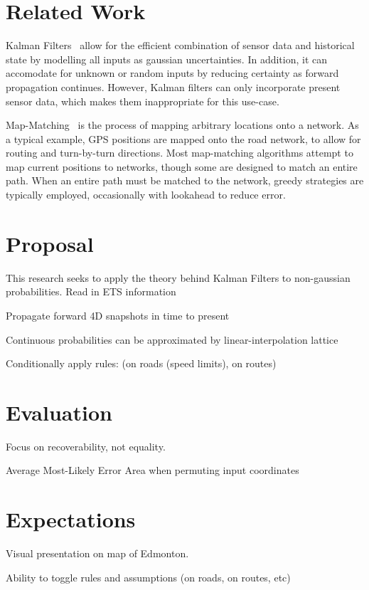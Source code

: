 \documentclass{article}
\begin{document}
\section{Related Work}

  Kalman Filters~\cite{kalmanJBE60} allow for the efficient combination of sensor data and historical state by modelling all inputs as gaussian uncertainties. In addition, it can accomodate for unknown or random inputs by reducing certainty as forward propagation continues. However, Kalman filters can only incorporate present sensor data, which makes them inappropriate for this use-case.

  Map-Matching~\cite{brakatsoulasVLDB05} is the process of mapping arbitrary locations onto a network. As a typical example, GPS positions are mapped onto the road network, to allow for routing and turn-by-turn directions.
Most map-matching algorithms attempt to map current positions to networks, though some are designed to match an entire path. When an entire path must be matched to the network, greedy strategies are typically employed, occasionally with lookahead to reduce error.

\section{Proposal}

This research seeks to apply the theory behind Kalman Filters to non-gaussian probabilities.
Read in ETS information

Propagate forward 4D snapshots in time to present

Continuous probabilities can be approximated by linear-interpolation lattice

Conditionally apply rules: (on roads (speed limits), on routes)

\section{Evaluation}

Focus on recoverability, not equality.

Average Most-Likely Error Area when permuting input coordinates

\section{Expectations}

Visual presentation on map of Edmonton.

Ability to toggle rules and assumptions (on roads, on routes, etc)
\end{document}
